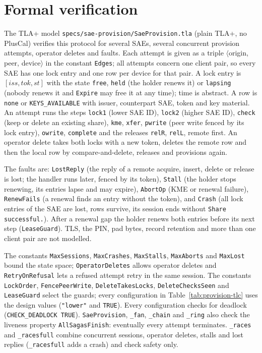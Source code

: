 \documentclass[11pt,a4paper]{article}
\begin{document}
\section{Formal verification}
\label{sec:provision-formal}

The TLA+ model \texttt{specs/sae-provision/SaeProvision.tla} (plain TLA+, no
PlusCal) verifies this protocol for several SAEs, several concurrent
provision attempts, operator deletes and faults. Each attempt is given as a
triple $\langle$origin, peer, device$\rangle$ in the constant \texttt{Edges};
all attempts concern one client pair, so every SAE has one lock entry and one
row per device for that pair. A lock entry is
$[\mathit{iss}, \mathit{tok}, \mathit{st}]$ with the state \texttt{free},
\texttt{held} (the holder renews it) or \texttt{lapsing} (nobody renews it and
\texttt{Expire} may free it at any time); time is abstract. A row is
\texttt{none} or \texttt{KEYS\_AVAILABLE} with issuer, counterpart SAE, token
and key material. An attempt runs the steps \texttt{lock1} (lower SAE ID),
\texttt{lock2} (higher SAE ID), \texttt{check} (keep or delete an existing
share), \texttt{kme}, \texttt{xfer}, \texttt{pwrite} (peer write fenced by
its lock entry), \texttt{owrite}, \texttt{complete} and the releases
\texttt{relR}, \texttt{relL}, remote first. An operator delete takes both locks
with a new token, deletes the remote row and then the local row by
compare-and-delete, releases and provisions again.

The faults are: \texttt{LostReply} (the reply of a remote acquire, insert,
delete or release is lost; the handler runs later, fenced by its token),
\texttt{Stall} (the holder stops renewing, its entries lapse and may expire),
\texttt{AbortOp} (KME or renewal failure), \texttt{RenewFails} (a renewal finds
an entry without the token), and \texttt{Crash} (all lock entries of the SAE
are lost, rows survive, its session ends without \texttt{Share successful.}).
After a renewal gap the holder renews both entries before its next step
(\texttt{LeaseGuard}). TLS, the PIN, pad bytes, record retention and more than
one client pair are not modelled.

The constants \texttt{MaxSessions}, \texttt{MaxCrashes}, \texttt{MaxStalls},
\texttt{MaxAborts} and \texttt{MaxLost} bound the state space;
\texttt{OperatorDeletes} allows operator deletes and \texttt{RetryOnRefusal}
lets a refused attempt retry in the same session. The constants
\texttt{LockOrder}, \texttt{FencePeerWrite}, \texttt{DeleteTakesLocks},
\texttt{DeleteChecksSeen} and \texttt{LeaseGuard} select the guards; every
configuration in Table~\ref{tab:provision-tlc} uses the design values
(\texttt{"lower"} and \texttt{TRUE}). Every configuration checks for deadlock
(\texttt{CHECK\_DEADLOCK TRUE}). \texttt{SaeProvision}, \texttt{\_fan},
\texttt{\_chain} and \texttt{\_ring} also check the liveness property
\texttt{AllSagasFinish}: eventually every attempt terminates.
\texttt{\_races} and \texttt{\_racesfull} combine concurrent sessions,
operator deletes, stalls and lost replies (\texttt{\_racesfull} adds a crash)
and check safety only.
\end{document}

